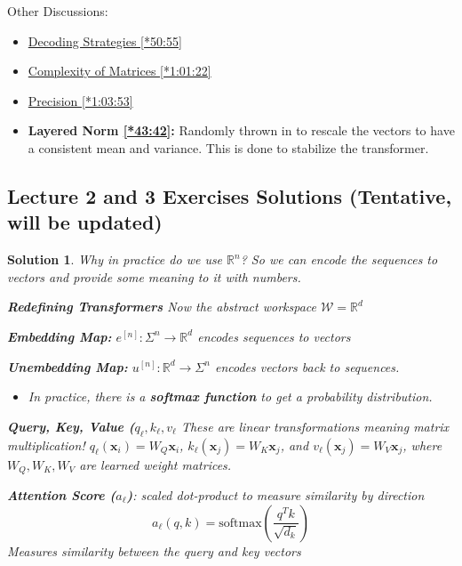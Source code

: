 \documentclass[12pt, twoside]{article}
\theoremstyle{spaceddefn}
\newtheorem{soln}{Solution}[section]
\begin{document}
Other Discussions:
\begin{itemize}
    \item \href{https://youtu.be/1u6h3Nm3NvM?si=DPbOrvmmc-rPRJFs&t=3055}{Decoding Strategies [*50:55]}
    \item \href{https://youtu.be/1u6h3Nm3NvM?si=vG1ilQpx0IZ3sRSs&t=3682}{Complexity of Matrices [*1:01:22]}
    \item \href{https://youtu.be/1u6h3Nm3NvM?si=9r417PXiPrKnlHgQ&t=3833}{Precision [*1:03:53]}
    \item \textbf{Layered Norm \href{https://youtu.be/1u6h3Nm3NvM?si=AD17k53UucXSlnau&t=2622}{[*43:42]}:} Randomly thrown in to rescale the vectors to have a consistent mean and variance. This is done to stabilize the transformer.
\end{itemize}


\newpage

\subsection*{Lecture 2 and 3 Exercises Solutions \small (Tentative, will be updated)}

\begin{soln}

Why in practice do we use $\mathbb{R}^n$? So we can encode the sequences to vectors and provide some meaning to it with numbers.

\textbf{Redefining Transformers}
Now the abstract workspace $\mathcal{W}=\mathbb{R}^d$

\textbf{Embedding Map:} $e^{[n]}: \Sigma^n \to \mathbb{R}^d$ encodes sequences to vectors

\textbf{Unembedding Map:} $u^{[n]}: \mathbb{R}^d \to \Sigma^n$ encodes vectors back to sequences.
\begin{itemize}
    \item In practice, there is a \textbf{softmax function} to get a probability distribution.
\end{itemize}

\textbf{Query, Key, Value ($q_\ell, k_\ell, v_\ell$} These are linear transformations meaning matrix multiplication! $q_\ell(\mathbf{x}_i) = W_Q \mathbf{x}_i$, $k_\ell(\mathbf{x}_j) = W_K \mathbf{x}_j$, and $v_\ell(\mathbf{x}_j) = W_V \mathbf{x}_j$, where $W_Q, W_K, W_V$ are learned weight matrices.

\textbf{Attention Score ($a_\ell$)}: scaled dot-product to measure similarity by direction
\[ a_\ell(q,k) = \text{softmax}\left(\frac{q^T k}{\sqrt{d_k}}\right) \]
Measures similarity between the query and key vectors


\end{soln}
\end{document}
